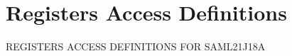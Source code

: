 \hypertarget{group___s_a_m_l21_j18_a__reg}{}\section{Registers Access Definitions}
\label{group___s_a_m_l21_j18_a__reg}
R\+E\+G\+I\+S\+T\+E\+R\+S A\+C\+C\+E\+S\+S D\+E\+F\+I\+N\+I\+T\+I\+O\+N\+S F\+O\+R S\+A\+M\+L21\+J18\+A 